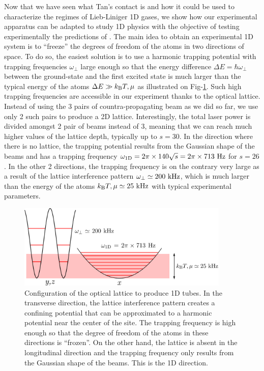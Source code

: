 Now that we have seen what Tan's contact is and how it could be used to characterize the regimes of Lieb-Liniger 1D gases, we show how our experimental apparatus can be adapted to study 1D physics with the objective of testing experimentally the predictions of \cite{yao2018tan}. The main idea to obtain an  experimental 1D system is to ``freeze'' the degrees of freedom of the atoms in two directions of space. To do so, the easiest solution is to use a harmonic trapping potential with trapping frequencies $\omega_{\perp}$ large enough so that the energy difference $\Delta E =\hbar \omega_{\perp}$ between the ground-state and the first excited state is much larger than the typical energy of the atoms $\Delta E \gg k_{\mathrm{B}} T, \mu$ as illustrated on Fig-\ref{fig:1D_config}. Such high trapping frequencies are accessible in our experiment thanks to the optical lattice. Instead of using the 3 pairs of countra-propagating beam as we did so far, we use only 2 such pairs to produce a 2D lattice. Interestingly, the total laser power is divided amongst 2 pair of beams instead of 3, meaning that we can reach much higher values of the lattice depth, typically up to $s=30$. In the direction where there is no lattice, the trapping potential results from the Gaussian shape of the beams and has a trapping frequency $\omega_{\rm{1D}} =2 \pi \times 140 \sqrt{s} = 2 \pi  \times 713 \ \rm{Hz}$ for $s=26$. In the other 2 directions, the trapping frequency is on the contrary very large as a result of the lattice interference pattern $\omega_{\perp} \simeq 200 \ \rm{kHz}$, which is much larger than the energy of the atoms $k_{\mathrm{B}} T, \mu \simeq 25 \ \rm{kHz}$ with typical experimental parameters.

\begin{figure}
    \centering
    \includegraphics[width=0.9\textwidth]{Fig/Chapter5/1D_config.png}
    \caption[Configuration of the optical lattice to produce 1D tubes]{Configuration of the optical lattice to produce 1D tubes. In the transverse direction, the lattice interference pattern creates a confining potential that can be approximated to a harmonic potential near the center of the site. The trapping frequency is high enough so that the degree of freedom of the atoms in these directions is ``frozen''. On the other hand, the lattice is absent in the longitudinal direction and the trapping frequency only results from the Gaussian shape of the beams. This is the 1D direction.}
    \label{fig:1D_config}
\end{figure}


